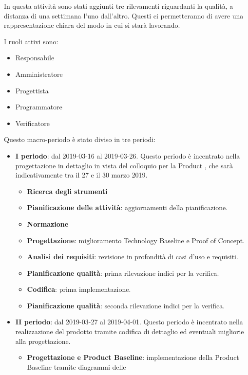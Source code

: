 		In questa attività sono stati aggiunti tre rilevamenti riguardanti la qualità, a distanza di una settimana l'uno
		dall'altro. Questi ci permetteranno di avere una rappresentazione chiara del modo in cui si starà lavorando.

        I ruoli attivi sono:
        \begin{itemize}
            \item Responsabile
            \item Amministratore
            \item Progettista
            \item Programmatore
            \item Verificatore
        \end{itemize}
        Questo macro-periodo è stato diviso in tre periodi:
		\begin{itemize}
			\item \textbf{I periodo}: dal 2019-03-16 al 2019-03-26. Questo periodo è incentrato nella progettazione in dettaglio
				in vista del colloquio per la Product , che sarà indicativamente tra il 27 e il 30 marzo 2019.
			\begin{itemize}
    	        \item \textbf{Ricerca degli strumenti}
    	        \item \textbf{Pianificazione delle attività}: aggiornamenti della pianificazione.
    	        \item \textbf{Normazione}
    	        \item \textbf{Progettazione}: miglioramento Technology Baseline e Proof of Concept.
                \item \textbf{Analisi dei requisiti}: revisione in profondità di casi d'uso e requisiti.
                \item \textbf{Pianificazione qualità}: prima rilevazione indici per la verifica.
    	        \item \textbf{Codifica}: prima implementazione.
    	        \item \textbf{Pianificazione qualità}: seconda rilevazione indici per la verifica.
        	\end{itemize}
			\item \textbf{II periodo}: dal 2019-03-27 al 2019-04-01. Questo periodo è incentrato nella realizzazione del prodotto tramite
				codifica di dettaglio ed eventuali migliorie alla progettazione.
			\begin{itemize}
				\item \textbf{Progettazione e Product Baseline}: implementazione della Product Baseline tramite diagrammi delle

\end{itemize}
\end{itemize}
